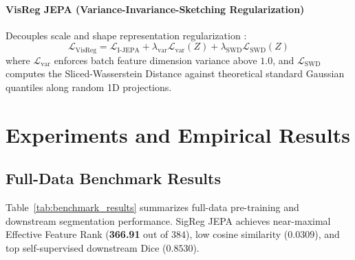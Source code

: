 \documentclass{article}
\begin{document}
\paragraph{VisReg JEPA (Variance-Invariance-Sketching Regularization)}
Decouples scale and shape representation regularization \citep{wu2026visreg}:
\begin{equation}
    \mathcal{L}_{\text{VisReg}} = \mathcal{L}_{\text{I-JEPA}} + \lambda_{\text{var}} \mathcal{L}_{\text{var}}(Z) + \lambda_{\text{SWD}} \mathcal{L}_{\text{SWD}}(Z)
\end{equation}
where $\mathcal{L}_{\text{var}}$ enforces batch feature dimension variance above $1.0$, and $\mathcal{L}_{\text{SWD}}$ computes the Sliced-Wasserstein Distance against theoretical standard Gaussian quantiles along random 1D projections.


\section{Experiments and Empirical Results}

\subsection{Full-Data Benchmark Results}
Table~\ref{tab:benchmark_results} summarizes full-data pre-training and downstream segmentation performance. SigReg JEPA achieves near-maximal Effective Feature Rank (\textbf{366.91} out of $384$), low cosine similarity ($0.0309$), and top self-supervised downstream Dice ($0.8530$).
\end{document}
